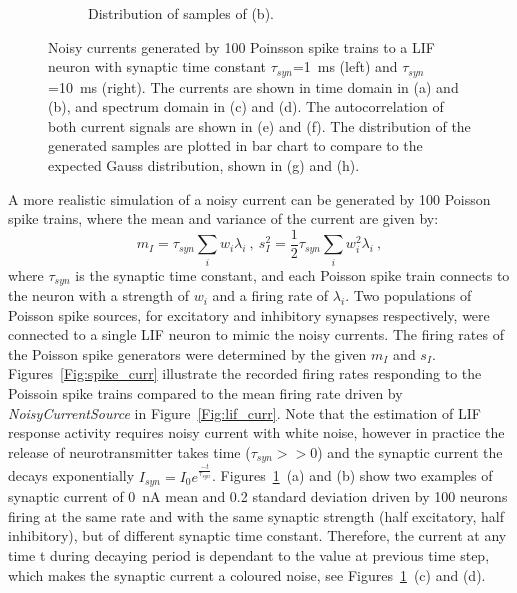 \begin{figure}[tbp!]
\begin{subfigure}[t]{0.43\textwidth}
			\caption{Distribution of samples of (b).}
		\end{subfigure}
		\caption{Noisy currents generated by 100 Poinsson spike trains to a LIF neuron with synaptic time constant $\tau_{syn}$=1~ms (left) and $\tau_{syn}$=10~ms (right). The currents are shown in time domain in (a) and (b), and spectrum domain in (c) and (d). The autocorrelation of both current signals are shown in (e) and (f). The distribution of the generated samples are plotted in bar chart to compare to the expected Gauss distribution, shown in (g) and (h).}
		\label{Fig:lif_pois}
	\end{figure}

	A more realistic simulation of a noisy current can be generated by 100 Poisson spike trains, 
	where the mean and variance of the current are given by:
	\begin{equation}
	m_I = \tau_{syn}\sum_i w_i\lambda_{i}~, ~s_I^2=\frac{1}{2}\tau_{syn}\sum_i w_i^2\lambda_{i}~,
	\label{equ:distr}
	\end{equation}
	where $\tau_{syn}$ is the synaptic time constant, and each Poisson spike train connects to the neuron with a strength of $w_i$ and a firing rate of $\lambda_i$.
	Two populations of Poisson spike sources, for excitatory and inhibitory synapses respectively, were connected to a single LIF neuron to mimic the noisy currents.
	The firing rates of the Poisson spike generators were determined by the given $m_I$ and $s_I$.
	Figures~\ref{Fig:spike_curr} illustrate the recorded firing rates responding to the Poissoin spike trains compared to the mean firing rate driven by \textit{NoisyCurrentSource} in Figure~\ref{Fig:lif_curr}.
	Note that the estimation of LIF response activity requires noisy current with white noise, however
	in practice the release of neurotransmitter takes time ($\tau_{syn} >> 0$) and the synaptic current the decays exponentially $I_{syn} = I_0 e^{\frac{-t}{\tau_{syn}}}$.
	Figures~\ref{Fig:lif_pois}~(a) and (b) show two examples of synaptic current of 0~nA mean and 0.2 standard deviation driven by 100 neurons firing at the same rate and with the same synaptic strength (half excitatory, half inhibitory), but of different synaptic time constant.
	Therefore, the current at any time t during decaying period is dependant to the value at previous time step, which makes the synaptic current a coloured noise, see Figures~\ref{Fig:lif_pois}~(c) and (d).
	
